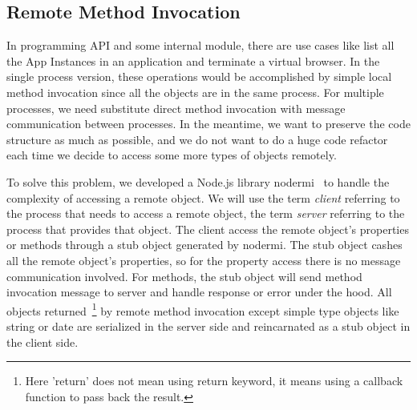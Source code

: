 
\subsection{Remote Method Invocation}
In \cb{} programming API and some internal module, there are use cases like list all the App Instances in an application
and terminate a virtual browser.
In the single process version, these operations would be accomplished by simple local method invocation
since all the objects are in the same process.
For multiple processes,
we need substitute direct method invocation with message communication between processes.
In the meantime, we want to preserve the code structure as much as possible,
and we do not want to do a huge code refactor each time we decide to access some more types of objects remotely.


To solve this problem,
we developed a Node.js library nodermi~\cite{nodermi} to handle the complexity of accessing a remote object.
We will use the term \emph{client} referring to the process that needs to access a remote object,
the term \emph{server} referring to the process that provides that object.
The client access the remote object's properties or methods through a stub object generated by nodermi.
The stub object cashes all the remote object's properties,
so for the property access there is no message communication involved.
For methods,
the stub object will send method invocation message to server and handle response or error under the hood.
All objects returned~\footnote{Here 'return' does not mean using return keyword, it means using a callback function to pass back the result.} by remote method invocation
 except simple type objects like string or date are serialized in the server side
 and reincarnated as a stub object in the client side.

